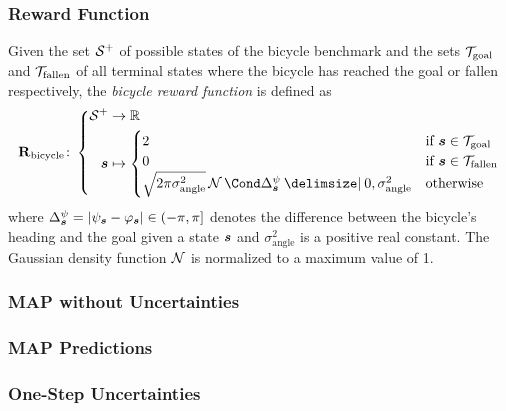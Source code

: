 \begin{frame}[label=solution_reward]
    \frametitle{Reward Function}

    \begin{definition}
        Given the set $\mathcal{S}^+$ of possible states of the bicycle benchmark and the sets $\mathcal{T}_{\text{goal}}$ and $\mathcal{T}_{\text{fallen}}$ of all terminal states where the bicycle has reached the goal or fallen respectively, the \emph{bicycle reward function} is defined as
        \begin{align}
            \RwdBicycle \colon \left\{
                \begin{aligned}
                    \Es^+ &\to \R \\
                    \mat{s} &\mapsto \begin{cases}
                    2 & \text{if $\mat{s} \in \Goal$} \\
                    0 & \text{if $\mat{s} \in \Fallen$} \\
                    \sqrt{2\pi\sigma_{\text{angle}}^2}\Gaussian{\Delta^\psi_{\mat{s}} \given 0, \sigma_{\text{angle}}^2} & \text{otherwise}
                \end{cases}
            \end{aligned}
            \right.
        \end{align}
    where $\Delta^\psi_{\bm{s}} = \vert\psi_{\bm{s}} - \varphi_{\bm{s}}\vert \in (-\pi, \pi]$ denotes the difference between the bicycle's heading and the goal given a state $\bm{s}$ and $\sigma_{\text{angle}}^2$ is a positive real constant.
    The Gaussian density function $\operatorname{\mathcal{N}}$ is normalized to a maximum value of 1.
    \end{definition}
\end{frame}

\begin{frame}[label=solution_map]
    \frametitle{MAP without Uncertainties}

    \centering
\end{frame}

\begin{frame}[label=solution_map_predictions]
    \frametitle{MAP Predictions}

    \centering
\end{frame}

\begin{frame}[label=solution_os]
    \frametitle{One-Step Uncertainties}

    \centering
\end{frame}


